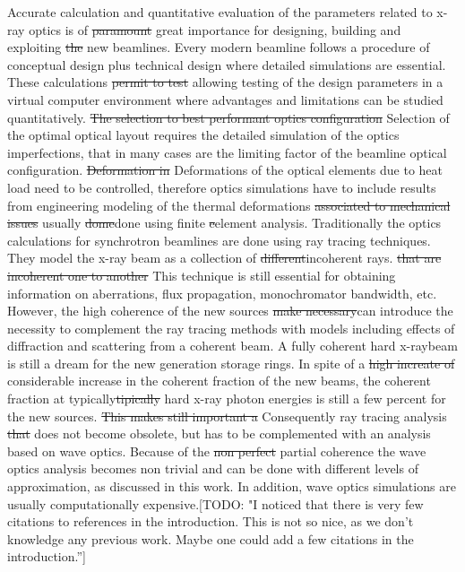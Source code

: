 \documentclass{iucr}              %
\newcommand{\todo}[1]{{\color{red}[TODO: "#1'']}}
\begin{document}
Accurate calculation and quantitative evaluation of the parameters related to x-ray optics is of {\color{green}\sout{paramount} great} importance for designing, building and exploiting {\color{green}\sout{the}} new beamlines. Every modern beamline follows a procedure of conceptual design plus technical design where detailed simulations are essential. These calculations  {\color{green}\sout{permit to test} allowing testing of} the design parameters in a virtual computer environment where advantages and limitations can be studied quantitatively. {\color{green}\sout{The selection to best performant optics configuration} Selection of the optimal optical layout}  requires the detailed simulation of the optics imperfections, that in many cases are the limiting factor of the beamline optical configuration. {\color{green}\sout{Deformation in} Deformations of} the optical elements due to heat load need to be controlled, therefore optics simulations have to include results from engineering modeling of the thermal deformations {\color{green}\sout{associated to mechanical issues}} usually {\color{red}\sout{dome}done} using finite {\color{red}\sout{e}}element analysis. Traditionally the optics calculations for synchrotron beamlines are done using ray tracing techniques. They model the x-ray beam as a collection of {\color{green}\sout{different}incoherent} rays. {\color{green}\sout{that are incoherent one to another}}  This technique is still essential for obtaining information on aberrations, flux propagation, monochromator bandwidth, etc. However, the high coherence of the new sources {\color{green}\sout{make necessary}can introduce the necessity} to complement the ray tracing methods with models including effects of diffraction and scattering from a coherent beam. A fully coherent {\color{green} hard x-ray}beam is still a dream for the new generation storage rings. In spite of a {\color{green}\sout{high increate of }considerable increase in}  the coherent fraction of the new beams, the coherent fraction at {\color{red}typically\sout{tipically}} hard x-ray photon energies is still a few percent for the new sources.  {\color{green}\sout{This makes still important a } Consequently} ray tracing analysis {\color{green}\sout{that}} does not become obsolete, but has to be complemented with an analysis based on wave optics. Because of the {\color{green}\sout{non perfect} partial} coherence the wave optics analysis becomes non trivial and can be done with different levels of approximation, as discussed in this work. In addition, wave optics simulations are usually computationally expensive.\todo{I noticed that there is very few citations to references in the introduction. This is not so nice, as we don't knowledge any previous work. Maybe one could add a few citations in the introduction.}
\end{document}
